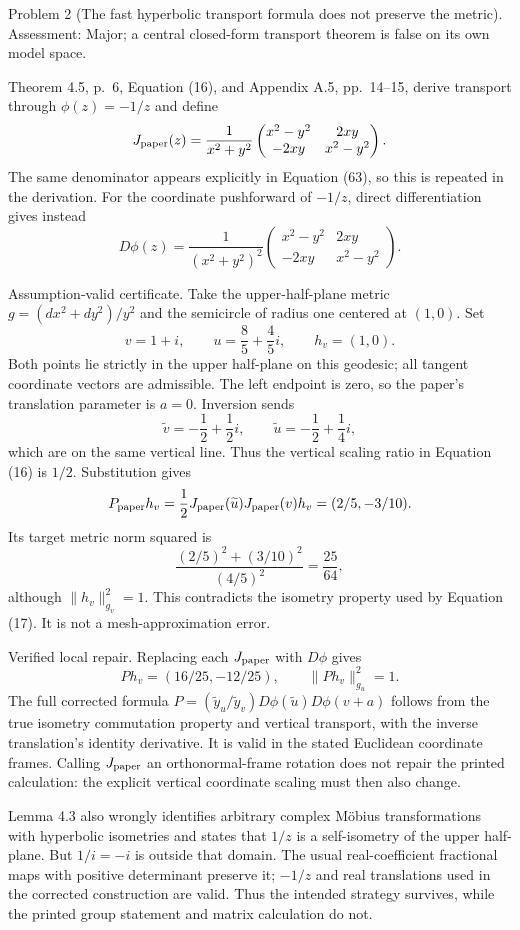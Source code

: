 \documentclass[10pt]{article}
\begin{document}
Problem 2 (The fast hyperbolic transport formula does not preserve the metric).  Assessment: Major; a central closed-form transport theorem is false on its own model space.\par
Theorem 4.5, p. 6, Equation (16), and Appendix A.5, pp. 14–15, derive transport through \(\phi(z)=-1/z\) and define \[J_{\rm paper}(z)=\frac1{x^2+y^2}
\begin{pmatrix}x^2-y^2&2xy\\-2xy&x^2-y^2\end{pmatrix}.\] The same denominator appears explicitly in Equation (63), so this is repeated in the derivation. For the coordinate pushforward of \(-1/z\), direct differentiation gives instead \[D\phi(z)=\frac1{(x^2+y^2)^2}
\begin{pmatrix}x^2-y^2&2xy\\-2xy&x^2-y^2\end{pmatrix}.\]\par
Assumption-valid certificate. Take the upper-half-plane metric \(g=(dx^2+dy^2)/y^2\) and the semicircle of radius one centered at \((1,0)\). Set \[v=1+i,\qquad u=\frac85+\frac45i,\qquad h_v=(1,0).\] Both points lie strictly in the upper half-plane on this geodesic; all tangent coordinate vectors are admissible. The left endpoint is zero, so the paper’s translation parameter is \(a=0\). Inversion sends \[\widetilde v=-\frac12+\frac12i,\qquad
\widetilde u=-\frac12+\frac14i,\] which are on the same vertical line. Thus the vertical scaling ratio in Equation (16) is \(1/2\). Substitution gives \[P_{\rm paper}h_v=\frac12J_{\rm paper}(\widetilde u)
J_{\rm paper}(v)h_v=(2/5,-3/10).\] Its target metric norm squared is \[\frac{(2/5)^2+(3/10)^2}{(4/5)^2}=\frac{25}{64},\] although \(\|h_v\|_{g_v}^2=1\). This contradicts the isometry property used by Equation (17). It is not a mesh-approximation error.\par
Verified local repair. Replacing each \(J_{\rm paper}\) with \(D\phi\) gives \[Ph_v=(16/25,-12/25),\qquad \|Ph_v\|_{g_u}^2=1.\] The full corrected formula \(P=(\widetilde y_u/\widetilde y_v)
D\phi(\widetilde u)D\phi(v+a)\) follows from the true isometry commutation property and vertical transport, with the inverse translation’s identity derivative. It is valid in the stated Euclidean coordinate frames. Calling \(J_{\rm paper}\) an orthonormal-frame rotation does not repair the printed calculation: the explicit vertical coordinate scaling must then also change.\par
Lemma 4.3 also wrongly identifies arbitrary complex Möbius transformations with hyperbolic isometries and states that \(1/z\) is a self-isometry of the upper half-plane. But \(1/i=-i\) is outside that domain. The usual real-coefficient fractional maps with positive determinant preserve it; \(-1/z\) and real translations used in the corrected construction are valid. Thus the intended strategy survives, while the printed group statement and matrix calculation do not.\par
\end{document}
